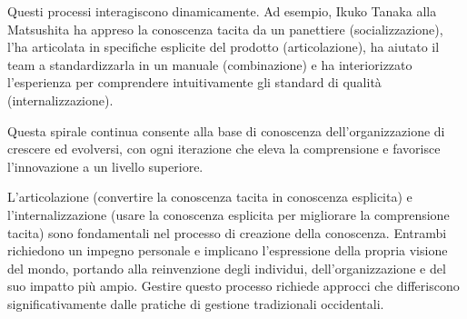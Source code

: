 \documentclass{article}
\begin{document}
Questi processi interagiscono dinamicamente. Ad esempio, Ikuko Tanaka alla Matsushita ha appreso la conoscenza tacita da un panettiere (socializzazione), l'ha articolata in specifiche esplicite del prodotto (articolazione), ha aiutato il team a standardizzarla in un manuale (combinazione) e ha interiorizzato l'esperienza per comprendere intuitivamente gli standard di qualità (internalizzazione).

Questa spirale continua consente alla base di conoscenza dell'organizzazione di crescere ed evolversi, con ogni iterazione che eleva la comprensione e favorisce l'innovazione a un livello superiore.

L'articolazione (convertire la conoscenza tacita in conoscenza esplicita) e l'internalizzazione (usare la conoscenza esplicita per migliorare la comprensione tacita) sono fondamentali nel processo di creazione della conoscenza. Entrambi richiedono un impegno personale e implicano l'espressione della propria visione del mondo, portando alla reinvenzione degli individui, dell'organizzazione e del suo impatto più ampio. Gestire questo processo richiede approcci che differiscono significativamente dalle pratiche di gestione tradizionali occidentali.
\end{document}
